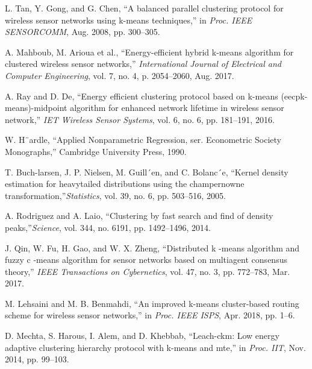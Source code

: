 \documentclass[journal,twoside,web]{ieeecolor}
\begin{document}
\begin{thebibliography}{00}
 L. Tan, Y. Gong, and G. Chen, ``A balanced parallel clustering protocol for wireless sensor networks using k-means techniques,'' in \emph{Proc. IEEE SENSORCOMM}, Aug. 2008, pp. 300--305.

 A. Mahboub, M. Arioua et al.,  ``Energy-efficient hybrid k-means algorithm for clustered wireless sensor networks,'' \emph{International Journal of Electrical and Computer Engineering}, vol. 7, no. 4, p. 2054--2060, Aug. 2017.

 A. Ray and D. De, ``Energy efficient clustering protocol based on k-means (eecpk-means)-midpoint algorithm for enhanced network lifetime in wireless sensor network,'' \emph{IET Wireless Sensor Systems}, vol. 6, no. 6, pp. 181--191, 2016.

 W. H¨ardle, ``Applied Nonparametric Regression, ser. Econometric Society Monographs,'' Cambridge University Press, 1990.

 T. Buch-larsen, J. P. Nielsen, M. Guill´en, and C. Bolanc´e, ``Kernel density estimation for heavytailed distributions using the champernowne transformation,''\emph{Statistics}, vol. 39, no. 6, pp. 503--516, 2005.

 A. Rodriguez and A. Laio, ``Clustering by fast search and find of density peaks,''\emph{Science}, vol. 344, no. 6191, pp. 1492--1496, 2014. 

 J. Qin, W. Fu, H. Gao, and W. X. Zheng, ``Distributed k -means algorithm and fuzzy c -means algorithm for sensor networks based on multiagent consensus theory,'' \emph{IEEE Transactions on Cybernetics}, vol. 47, no. 3, pp. 772--783, Mar. 2017.

 M. Lehsaini and M. B. Benmahdi, ``An improved k-means cluster-based routing scheme for wireless sensor networks,'' in \emph{Proc. IEEE ISPS}, Apr. 2018, pp. 1--6.


 D. Mechta, S. Harous, I. Alem, and D. Khebbab, ``Leach-ckm: Low energy adaptive clustering hierarchy protocol with k-means and mte,'' in \emph{Proc. IIT}, Nov. 2014, pp. 99--103.



\end{thebibliography}
\end{document}
